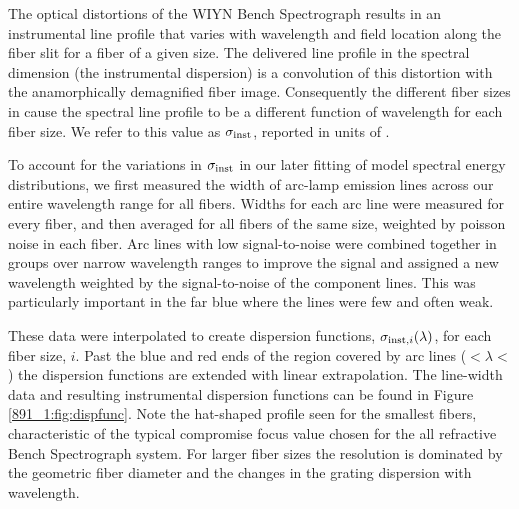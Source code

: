 The optical distortions of the WIYN Bench Spectrograph results in an
instrumental line profile that varies with wavelength and field
location along the fiber slit for a fiber of a given size. The
delivered line profile in the spectral dimension (the instrumental
dispersion) is a convolution of this distortion with the
anamorphically demagnified fiber image. Consequently the different
fiber sizes in \GP cause the spectral line profile to be a different
function of wavelength for each fiber size. We refer to this value as
$\sigma_{\rm inst}$, reported in units of \kms.

To account for the variations in $\sigma_{\rm inst}$ in our later
fitting of model spectral energy distributions, we first measured the
width of arc-lamp emission lines across our entire wavelength range
for all fibers. Widths for each arc line were measured for every
fiber, and then averaged for all fibers of the same size, weighted by
poisson noise in each fiber. Arc lines with low signal-to-noise were
combined together in groups over narrow wavelength ranges to improve
the signal and assigned a new wavelength weighted by the
signal-to-noise of the component lines. This was particularly
important in the far blue where the lines were few and often
weak.

These data were interpolated to create dispersion functions,
$\sigma_{{\rm inst},i}(\lambda)$, for each fiber size, $i$. Past the
blue and red ends of the region covered by arc lines
($<\lambda <$ ) the dispersion functions
are extended with linear extrapolation. The line-width data and
resulting instrumental dispersion functions can be found in Figure
\ref{891_1:fig:dispfunc}. Note the hat-shaped profile seen for the smallest
fibers, characteristic of the typical compromise focus value chosen
for the all refractive Bench Spectrograph system. For larger fiber
sizes the resolution is dominated by the geometric fiber diameter and
the changes in the grating dispersion with wavelength.


